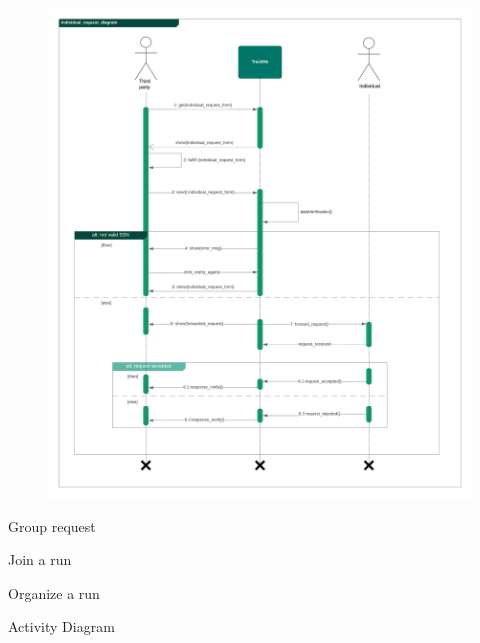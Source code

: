 \documentclass{article}
\begin{document}
\begin{legal}
\begin{legal}
\begin{legal}
\begin{legal}
\begin{figure}[H]
  				\includegraphics[width=\linewidth]{./images/seq-diagrams/Individual_request_diagram.png}
				\end{figure}
			\item Group request
				\begin{figure}[H]
				\end{figure}
			\item Join a run 
				\begin{figure}[H]
				\end{figure}
			\item Organize a run
				\begin{figure}[H]
				\end{figure}
	  		\end{legal}
			\item Activity Diagram
				\begin{figure}[H]
				\center

\end{figure}
\end{legal}
\end{legal}
\end{legal}
\end{document}
